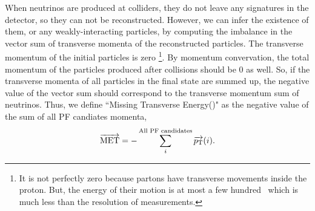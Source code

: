 When neutrinos are produced at colliders, they do not leave any signatures
in the detector, so they can not be reconstructed. However, we can infer 
the existence of them, or any weakly-interacting particles, by computing 
the imbalance in the vector sum of transverse momenta of the reconstructed particles.
The transverse momentum of the initial particles is zero 
\footnote{It is not perfectly zero because partons have transverse movements 
inside the proton. But, the energy of their motion is at most a few hundred \MeV\
which is much less than the resolution of measurements.}.
By momentum convervation, the total momentum of the particles produced 
after collisions should be 0 as well. 
So, if the transverse momenta of all particles in the final state are summed up, 
the negative value of the vector sum should correspond to the transverse momentum 
sum of neutrinos. Thus, we define ``Missing Transverse Energy(\met)"
as the negative value of the sum of all PF candiates momenta, 
\begin{eqnarray} 
\overrightarrow{\mathrm{MET}} = - \sum^{\textrm{All PF candidates}}_i \overrightarrow{p_\mathrm{T}}(i).
\end{eqnarray} 

